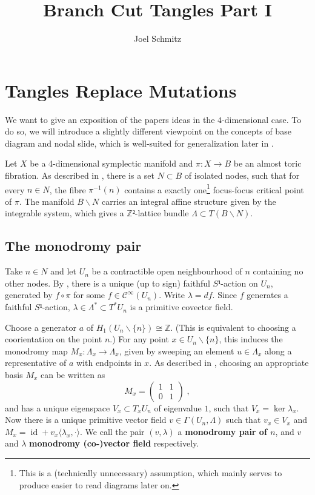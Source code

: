 \documentclass[12pt,a4paper,abstract=true,draft]{scrartcl}
\DeclareMathOperator{\id}{id}
\newcommand\mqty[1]{\begin{pmatrix}#1\end{pmatrix}}
\begin{document}
\title{Branch Cut Tangles Part I}
\author{Joel Schmitz}
\maketitle

\section{Tangles Replace Mutations}

We want to give an exposition of the papers ideas in the $4$-dimensional case.
To do so, we will introduce a slightly different viewpoint on the concepts of base diagram and nodal slide, which is well-suited for generalization later in .

Let $X$ be a 4-dimensional symplectic manifold and $π \colon X → B$ be an almost toric fibration.
As described in \cite{evans2021atfs}, there is a set $N ⊂ B$ of isolated nodes, such that for every $n ∈ N$, the fibre $π^{-1}(n)$ contains a exactly one\footnote{This is a (technically unnecessary) assumption, which mainly serves to produce easier to read diagrams later on.} focus-focus critical point of $π$.
The manifold $B ∖ N$ carries an integral affine structure given by the integrable system, which gives a $ℤ²$-lattice bundle $Λ ⊂ T(B ∖ N)$.

\subsection{The monodromy pair}
Take $n ∈ N$ and let $U_n$ be a contractible open neighbourhood of $n$ containing no other nodes.
By \cite[Proposition 1]{Zun97}, there is a unique (up to sign) faithful $S¹$-action on $U_n$, generated by $f ∘ π$ for some $f ∈ 𝒞^∞(U_n)$.
Write $λ = df$.
Since $f$ generates a faithful $S¹$-action, $λ ∈ Λ^* ⊂ T^* U_n$ is a primitive covector field.

Choose a generator $a$ of $H_1(U_n ∖ \{n\}) ≅ ℤ$. (This is equivalent to choosing a coorientation on the point $n$.)
For any point $x ∈ U_n ∖ \{n\}$, this induces the monodromy map $M_x \colon Λ_x → Λ_x$, given by sweeping an element $u ∈ Λ_x$ along a representative of $a$ with endpoints in $x$.
As described in \cite[Lemma 1]{Zun97}, choosing an appropriate basis $M_x$ can be written as
\[ M_x = \mqty{1 & 1\\0 & 1}\; ,\]
and has a unique eigenspace $V_x ⊂ T_x U_n$ of eigenvalue $1$, such that $V_x = \ker λ_x$.
Now there is a unique primitive vector field $v ∈ Γ(U_n,Λ)$ such that $v_x ∈ V_x$ and $M_x = \id + v_x ⟨ λ_x, · ⟩$.
We call the pair $(v,λ)$ a \textbf{monodromy pair of $n$}, and $v$ and $λ$ \textbf{monodromy (co-)vector field} respectively.
\end{document}
